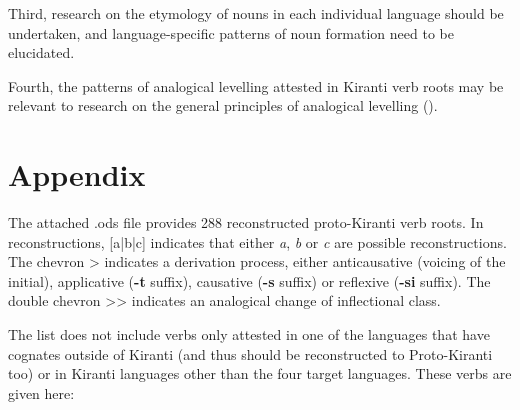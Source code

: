 \documentclass[oneside,a4paper,11pt]{article}
\newcommand{\ipa}[1]{\textbf{{\phon\mbox{#1}}}} %
\begin{document}
Third, research on the etymology of nouns in each individual language should be undertaken, and language-specific patterns of noun formation need to be elucidated.


Fourth, the patterns of analogical levelling attested in Kiranti verb roots may be relevant to research on the general principles of analogical levelling (\citealt{hill07ausgleich, hill14conditioned,jacques16ebde}).


\section{Appendix} \label{sec:appendix}
The attached .ods file provides 288 reconstructed proto-Kiranti verb roots. In reconstructions, [a|b|c] indicates that either \textit{a}, \textit{b} or \textit{c} are possible reconstructions. The chevron > indicates a derivation process, either anticausative (voicing of the initial), applicative (\ipa{-t} suffix), causative (\ipa{-s} suffix) or reflexive (\ipa{-si} suffix). The double chevron {>}{>} indicates an analogical change of inflectional class.

The list does not include verbs only attested in one of the languages that have cognates outside of Kiranti (and thus should be reconstructed to Proto-Kiranti too) or in Kiranti languages other than the four target languages. These verbs are given here:
\end{document}

